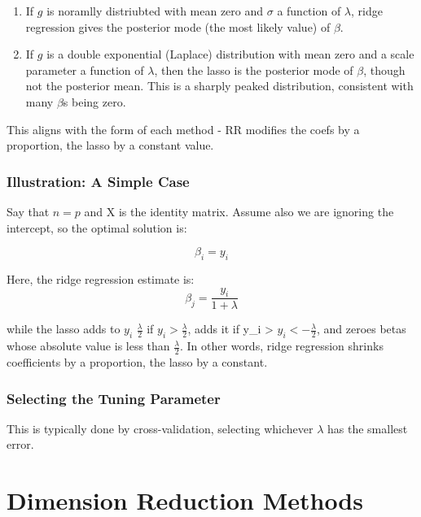 \documentclass[
]{article}
\begin{document}
\begin{enumerate}
\def\labelenumi{\arabic{enumi}.}
\item
  If \(g\) is noramlly distriubted with mean zero and \(\sigma\) a
  function of \(\lambda\), ridge regression gives the posterior mode
  (the most likely value) of \(\beta\).
\item
  If \(g\) is a double exponential (Laplace) distribution with mean zero
  and a scale parameter a function of \(\lambda\), then the lasso is the
  posterior mode of \(\beta\), though not the posterior mean. This is a
  sharply peaked distribution, consistent with many \(\beta\)s being
  zero.
\end{enumerate}

This aligns with the form of each method - RR modifies the coefs by a
proportion, the lasso by a constant value.

\hypertarget{illustration-a-simple-case}{%
\subsubsection{Illustration: A Simple
Case}\label{illustration-a-simple-case}}

Say that \(n=p\) and X is the identity matrix. Assume also we are
ignoring the intercept, so the optimal solution is:

\[\beta_i=y_i\]

Here, the ridge regression estimate is:
\[\beta_j=\frac{y_i}{1+\lambda}\]

while the lasso adds to \(y_i\) \(\frac{\lambda}{2}\) if
\(y_i > \frac{\lambda}{2}\), adds it if y\_i \textgreater{}
\(y_i < -\frac{\lambda}{2}\), and zeroes betas whose absolute value is
less than \(\frac{\lambda}{2}\). In other words, ridge regression
shrinks coefficients by a proportion, the lasso by a constant.

\hypertarget{selecting-the-tuning-parameter}{%
\subsubsection{Selecting the Tuning
Parameter}\label{selecting-the-tuning-parameter}}

This is typically done by cross-validation, selecting whichever
\(\lambda\) has the smallest error.

\hypertarget{dimension-reduction-methods}{%
\section{Dimension Reduction
Methods}\label{dimension-reduction-methods}}
\end{document}
